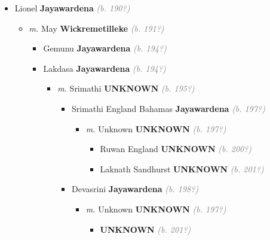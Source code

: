 \documentclass[10pt, openany]{book}
\begin{document}
\begin{itemize}
{\begin{itemize}
{\begin{itemize}
{\begin{itemize}
{\begin{itemize}
{\begin{itemize}
{ }
\end{itemize}}
\end{itemize}
 }
\end{itemize}}
\end{itemize}
 }
\item{Lionel \textbf{Jayawardena} \textcolor{gray}{\textit{(b. 190?)}}
\begin{itemize}
\item{\textit{m.} May \textbf{Wickremetilleke} \textcolor{gray}{\textit{(b. 191?)}}   \label{couple:00003397:00003398} \begin{itemize}
\item{Gemunu \textbf{Jayawardena} \textcolor{gray}{\textit{(b. 194?)}}
 }
\item{Lakdasa \textbf{Jayawardena} \textcolor{gray}{\textit{(b. 194?)}}
\begin{itemize}
\item{\textit{m.} Srimathi \textbf{UNKNOWN} \textcolor{gray}{\textit{(b. 195?)}}   \label{couple:00003400:00003401} \begin{itemize}
\item{Srimathi England Bahamas \textbf{Jayawardena} \textcolor{gray}{\textit{(b. 197?)}}
\begin{itemize}
\item{\textit{m.} Unknown \textbf{UNKNOWN} \textcolor{gray}{\textit{(b. 197?)}}   \label{couple:00003402:00003403} \begin{itemize}
\item{Ruwan England \textbf{UNKNOWN} \textcolor{gray}{\textit{(b. 200?)}}
  }
\item{Laknath Sandhurst \textbf{UNKNOWN} \textcolor{gray}{\textit{(b. 201?)}}
  }
\end{itemize}}
\end{itemize}
   }
\item{Devasrini \textbf{Jayawardena} \textcolor{gray}{\textit{(b. 198?)}}
\begin{itemize}
\item{\textit{m.} Unknown \textbf{UNKNOWN} \textcolor{gray}{\textit{(b. 197?)}}   \label{couple:00003408:00003409} \begin{itemize}
\item{ \textbf{UNKNOWN} \textcolor{gray}{\textit{(b. 201?)}}
}
\end{itemize}}
\end{itemize}}
\end{itemize}}
\end{itemize}}
\end{itemize}}
\end{itemize}}
\end{itemize}}
\end{itemize}
\end{document}
